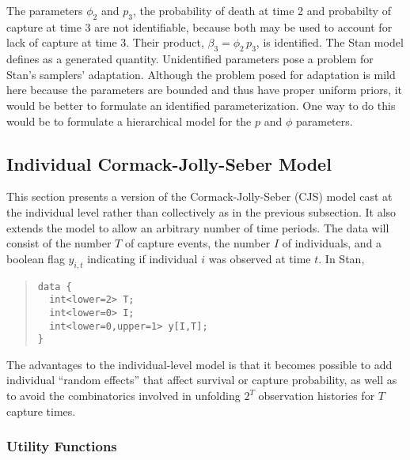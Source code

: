 The parameters $\phi_2$ and $p_3$, the probability of death at time 2
and probabilty of capture at time 3 are not identifiable, because both
may be used to account for lack of capture at time 3.  Their product,
$\beta_3 = \phi_2 \, p_3$, is identified.  The Stan model defines
 as a generated quantity.  Unidentified parameters pose a
problem for Stan's samplers' adaptation.  Although the problem posed
for adaptation is mild here because the parameters are bounded and
thus have proper uniform priors, it would be better to formulate an
identified parameterization.  One way to do this would be to formulate
a hierarchical model for the $p$ and $\phi$ parameters.

\subsection{Individual Cormack-Jolly-Seber Model}

This section presents a version of the Cormack-Jolly-Seber (CJS) model
cast at the individual level rather than collectively as in the
previous subsection.  It also extends the model to allow an arbitrary
number of time periods.  The data will consist of the number $T$ of
capture events, the number $I$ of individuals, and a boolean flag
$y_{i,t}$ indicating if individual $i$ was observed at time $t$.  In
Stan,
%
\begin{quote}
\begin{Verbatim}
data {
  int<lower=2> T;
  int<lower=0> I;
  int<lower=0,upper=1> y[I,T];
}
\end{Verbatim}
\end{quote}

The advantages to the individual-level model is that it becomes
possible to add individual ``random effects'' that affect survival or
capture probability, as well as to avoid the combinatorics involved in
unfolding $2^T$ observation histories for $T$ capture times.

\subsubsection{Utility Functions}

